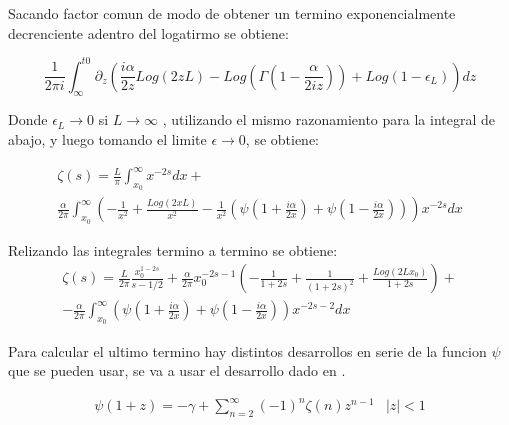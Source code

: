 Sacando factor comun de modo de obtener un termino exponencialmente decrenciente adentro del logatirmo se obtiene:

\begin{equation}
\frac{1}{2 \pi i}  \int _{\infty} ^{t0} 
\partial _{z}
\left(
\frac{i\alpha}{2 z} Log ( 2 z L ) - 
Log \left( \Gamma \left( 1 - \frac{ \alpha}{2 i z} \right) \right) +
Log \left( 1- \epsilon _L \right)
\right)
d z
\end{equation}

Donde $ \epsilon _L \rightarrow 0$ si $L \rightarrow \infty $ , utilizando el mismo razonamiento para la integral de abajo, y luego tomando el limite $\epsilon \rightarrow 0$, se obtiene:

\begin{equation}
\begin{array}{c}
\zeta (s) = 
\frac{L}{\pi}
\int _ {x_0} ^{\infty} x ^{-2s} dx + \\[10pt]
\frac{\alpha}{2 \pi } \int _{x_0} ^{\infty} 
\left(-
\frac{1}{ x ^2} +
\frac{Log \left( 2 x L \right) }{x ^2}  -
\frac{1}{ x ^2 } 
\left(
\psi (1 + \frac{i \alpha}{2 x}) + \psi (1 - \frac{i \alpha}{2 x}) 
\right)
\right)
x ^{-2s} d x
\end{array}
\end{equation}



Relizando las integrales termino a termino se obtiene:
\begin{equation}
\begin{array}{c}
\zeta (s) = 


\frac{L}{2 \pi} \frac{x _0 ^{1-2s}}{s-1/2} + 


\frac{\alpha}{2 \pi} x _{0} ^{-2s-1}
\left( 
	-\frac{1}{1+2s} +
	\frac{1}{(1+2s) ^2} +
	\frac{Log(2 L x _0)}{1+2s} 
	\right) + 

  \\[10pt]


- \frac{\alpha}{2 \pi}
\int _{x_0} ^{\infty} 
\left(
\psi(1 + \frac{i \alpha}{2 x}) +
\psi(1 - \frac{i \alpha}{2 x} )
\right)
x ^{-2s-2}
dx
\end{array}
\end{equation}


Para calcular el ultimo termino hay distintos desarrollos en serie de la funcion $\psi $ que se pueden usar, se va a usar el desarrollo dado en \cite{Abramowitz:1974:HMF:1098650}.

\begin{equation}
\begin{array}{cc}
\psi (1+ z ) = - \gamma + \sum _{n=2} ^{\infty} (-1) ^n \zeta (n) z ^{n-1} & |z| < 1
\end{array}
\end{equation}

